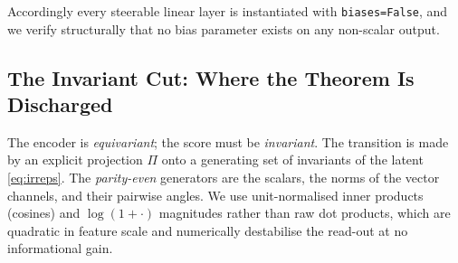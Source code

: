 Accordingly every steerable linear layer is instantiated with \texttt{biases=False}, and we verify
structurally that no bias parameter exists on any non-scalar output.

\subsection{The Invariant Cut: Where the Theorem Is Discharged}
\label{sec:method:cut}

The encoder is \emph{equivariant}; the score must be \emph{invariant}. The transition is made by an
explicit projection $\Pi$ onto a generating set of invariants of the latent \eqref{eq:irreps}. The
\emph{parity-even} generators are the scalars, the norms of the vector channels, and their pairwise
angles. We use unit-normalised inner products (cosines) and $\log(1+\cdot)$ magnitudes rather than raw
dot products, which are quadratic in feature scale and numerically destabilise the read-out at no
informational gain.

